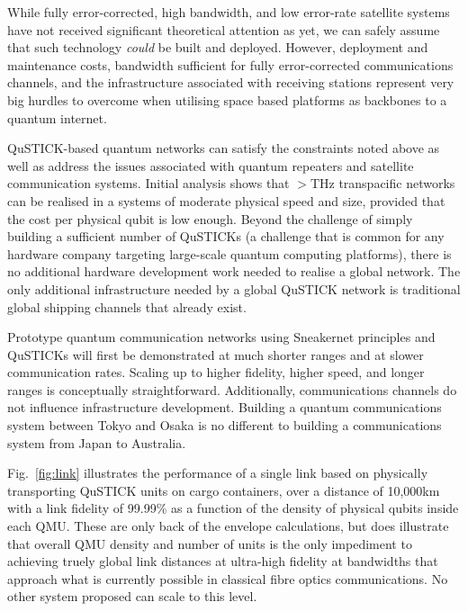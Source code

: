 \documentclass[twocolumn, aps, rmp, amsmath, amssymb, nofootinbib, superscriptaddress, longbibliography, floatfix, table-of-contents, eqsecnum]{revtex4-2}
\begin{document}
While fully error-corrected, high bandwidth, and low error-rate satellite systems have not received significant theoretical attention as yet, we can safely assume that such technology \textit{could} be built and deployed. However, deployment and maintenance costs, bandwidth sufficient for fully error-corrected communications channels, and the infrastructure associated with receiving stations represent very big hurdles to overcome when utilising space based platforms as backbones to a quantum internet. 

QuSTICK-based quantum networks can satisfy the constraints noted above as well as address the issues associated with quantum repeaters and satellite communication systems. Initial analysis shows that $>$THz transpacific networks can be realised in a systems of moderate physical speed and size, provided that the cost per physical qubit is low enough. Beyond the challenge of simply building a sufficient number of QuSTICKs (a challenge that is common for any hardware company targeting large-scale quantum computing platforms), there is no additional hardware development work needed to realise a global network. The only additional infrastructure needed by a global QuSTICK network is traditional global shipping channels that already exist. 

Prototype quantum communication networks using Sneakernet principles and QuSTICKs will first be demonstrated at much shorter ranges and at slower communication rates. Scaling up to higher fidelity, higher speed, and longer ranges is conceptually straightforward. Additionally, communications channels do not influence infrastructure development. Building a quantum communications system between Tokyo and Osaka is no different to building a communications system from Japan to Australia. 

Fig.~\ref{fig:link} illustrates the performance of a single link based on physically transporting QuSTICK units on cargo containers, over a distance of 10,000km with a link fidelity of 99.99\% as a function of the density of physical qubits inside each QMU. These are only back of the envelope calculations, but does illustrate that overall QMU density and number of units is the only impediment to achieving truely global link distances at ultra-high fidelity at bandwidths that approach what is currently possible in classical fibre optics communications. No other system proposed can scale to this level.
 
\end{document}
